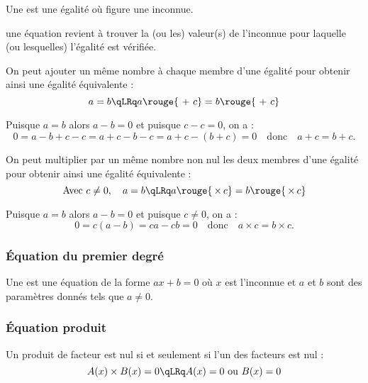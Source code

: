 \documentclass[10pt,openright,twoside,french]{book}
\begin{document}
\pagestyle{empty}

\begin{Defi}
    Une  est une égalité où figure une inconnue.\par
     une équation revient à trouver la (ou les) valeur(s) de l'inconnue pour laquelle (ou lesquelles) l'égalité est vérifiée.
\end{Defi}

\begin{Prop}
On peut ajouter un même nombre à chaque membre d'une égalité pour obtenir ainsi une égalité équivalente :
    \[a = b \qLRq a \rouge{\ +\ c } = b \rouge{\ +\ c}\]
\end{Prop}

\begin{Demo}
    Puisque $a = b$ alors $a - b = 0$ et puisque $c - c = 0$, on a :
    \[0 = a - b + c - c = a + c - b - c = a + c - (b + c) = 0 \quad \text{donc} \quad a+c = b+c.\]
\end{Demo}

\begin{Prop}
    On peut multiplier par un même nombre non nul les deux membres d'une égalité pour obtenir ainsi une égalité équivalente :
    \[\text{Avec } c\neq 0,\quad a = b \qLRq a \rouge{\,\times\,c} = b \rouge{\,\times\,c}\]
\end{Prop}

\begin{Demo}
    Puisque $a = b$ alors $a - b = 0$ et puisque $c \neq 0$, on a :
    \[0 = c(a - b) = ca - cb = 0 \quad \text{donc} \quad a \times c = b \times c.\]
\end{Demo}

\subsubsection{\'Equation du premier degré}
\begin{Defi}
    Une  est une équation de la forme $ax + b = 0$ où $x$ est l'inconnue et $a$ et $b$ sont des paramètres donnés tels que $a \neq 0$.\par
\end{Defi}

\subsubsection{\'Equation produit}
\begin{Prop}[(admise)]
    Un produit de facteur est nul si et seulement si l'un des facteurs est nul :
    \[A(x) \times B(x) = 0 \qLRq A(x) = 0 \text{ ou } B(x) = 0\]
\end{Prop}
\end{document}
